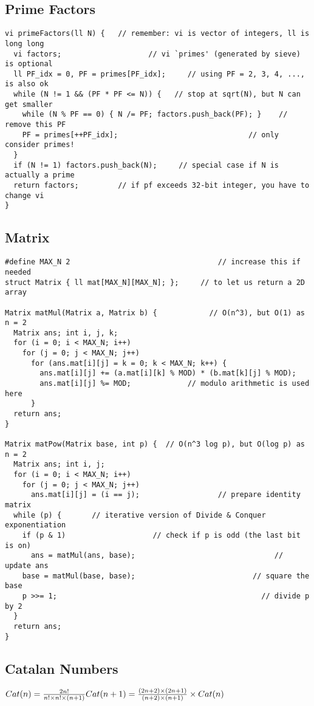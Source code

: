 \documentclass[letterpaper]{article}
\begin{document}
\subsection{Prime Factors}
\begin{lstlisting}
vi primeFactors(ll N) {   // remember: vi is vector of integers, ll is long long
  vi factors;                    // vi `primes' (generated by sieve) is optional
  ll PF_idx = 0, PF = primes[PF_idx];     // using PF = 2, 3, 4, ..., is also ok
  while (N != 1 && (PF * PF <= N)) {   // stop at sqrt(N), but N can get smaller
    while (N % PF == 0) { N /= PF; factors.push_back(PF); }    // remove this PF
    PF = primes[++PF_idx];                              // only consider primes!
  }
  if (N != 1) factors.push_back(N);     // special case if N is actually a prime
  return factors;         // if pf exceeds 32-bit integer, you have to change vi
}
\end{lstlisting}

\subsection{Matrix}
\begin{lstlisting}
#define MAX_N 2                                  // increase this if needed
struct Matrix { ll mat[MAX_N][MAX_N]; };     // to let us return a 2D array

Matrix matMul(Matrix a, Matrix b) {            // O(n^3), but O(1) as n = 2
  Matrix ans; int i, j, k;
  for (i = 0; i < MAX_N; i++)
    for (j = 0; j < MAX_N; j++)
      for (ans.mat[i][j] = k = 0; k < MAX_N; k++) {
        ans.mat[i][j] += (a.mat[i][k] % MOD) * (b.mat[k][j] % MOD);
        ans.mat[i][j] %= MOD;             // modulo arithmetic is used here
      }
  return ans;
}

Matrix matPow(Matrix base, int p) {  // O(n^3 log p), but O(log p) as n = 2
  Matrix ans; int i, j;
  for (i = 0; i < MAX_N; i++)
    for (j = 0; j < MAX_N; j++)
      ans.mat[i][j] = (i == j);                  // prepare identity matrix
  while (p) {       // iterative version of Divide & Conquer exponentiation
    if (p & 1)                    // check if p is odd (the last bit is on)
      ans = matMul(ans, base);                                // update ans
    base = matMul(base, base);                           // square the base
    p >>= 1;                                               // divide p by 2
  }
  return ans;
}
\end{lstlisting}

\subsection{Catalan Numbers}
\(Cat(n) = \frac{2n!}{n!\times n! \times (n + 1)} \\ 
Cat(n + 1) = \frac{(2n + 2) \times (2n + 1)}{(n + 2) \times (n + 1)}
\times Cat(n) \)
\end{document}
